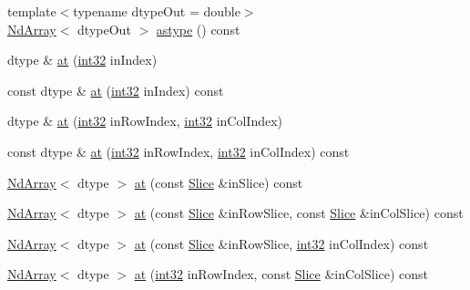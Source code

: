 \begin{DoxyCompactItemize}
\item 
{\footnotesize template$<$typename dtype\+Out  = double$>$ }\\\mbox{\hyperlink{class_num_c_1_1_nd_array}{Nd\+Array}}$<$ dtype\+Out $>$ \mbox{\hyperlink{class_num_c_1_1_nd_array_a03c8719dffd012fa234b4ae2feae2ed2}{astype}} () const
\item 
dtype \& \mbox{\hyperlink{class_num_c_1_1_nd_array_ad50a883233561c1b8345678ae5b1480e}{at}} (\mbox{\hyperlink{namespace_num_c_aa5a7e69266097d55816d4cdb19542b53}{int32}} in\+Index)
\item 
const dtype \& \mbox{\hyperlink{class_num_c_1_1_nd_array_a4d705eda354e6632dd457d3a33456073}{at}} (\mbox{\hyperlink{namespace_num_c_aa5a7e69266097d55816d4cdb19542b53}{int32}} in\+Index) const
\item 
dtype \& \mbox{\hyperlink{class_num_c_1_1_nd_array_a1b7551b29fd04ad88102ae279357057a}{at}} (\mbox{\hyperlink{namespace_num_c_aa5a7e69266097d55816d4cdb19542b53}{int32}} in\+Row\+Index, \mbox{\hyperlink{namespace_num_c_aa5a7e69266097d55816d4cdb19542b53}{int32}} in\+Col\+Index)
\item 
const dtype \& \mbox{\hyperlink{class_num_c_1_1_nd_array_a2a0ece5152ba2a14d4e9ae0566499052}{at}} (\mbox{\hyperlink{namespace_num_c_aa5a7e69266097d55816d4cdb19542b53}{int32}} in\+Row\+Index, \mbox{\hyperlink{namespace_num_c_aa5a7e69266097d55816d4cdb19542b53}{int32}} in\+Col\+Index) const
\item 
\mbox{\hyperlink{class_num_c_1_1_nd_array}{Nd\+Array}}$<$ dtype $>$ \mbox{\hyperlink{class_num_c_1_1_nd_array_a2be747f5c745a8a70fc1e036c912ec4a}{at}} (const \mbox{\hyperlink{class_num_c_1_1_slice}{Slice}} \&in\+Slice) const
\item 
\mbox{\hyperlink{class_num_c_1_1_nd_array}{Nd\+Array}}$<$ dtype $>$ \mbox{\hyperlink{class_num_c_1_1_nd_array_a45b3ca6d928b673c97bd9e2792a71706}{at}} (const \mbox{\hyperlink{class_num_c_1_1_slice}{Slice}} \&in\+Row\+Slice, const \mbox{\hyperlink{class_num_c_1_1_slice}{Slice}} \&in\+Col\+Slice) const
\item 
\mbox{\hyperlink{class_num_c_1_1_nd_array}{Nd\+Array}}$<$ dtype $>$ \mbox{\hyperlink{class_num_c_1_1_nd_array_aa81e931f772bb2a452e77cfa6760f45c}{at}} (const \mbox{\hyperlink{class_num_c_1_1_slice}{Slice}} \&in\+Row\+Slice, \mbox{\hyperlink{namespace_num_c_aa5a7e69266097d55816d4cdb19542b53}{int32}} in\+Col\+Index) const
\item 
\mbox{\hyperlink{class_num_c_1_1_nd_array}{Nd\+Array}}$<$ dtype $>$ \mbox{\hyperlink{class_num_c_1_1_nd_array_ab54ef20be682805145902d979e9a0c44}{at}} (\mbox{\hyperlink{namespace_num_c_aa5a7e69266097d55816d4cdb19542b53}{int32}} in\+Row\+Index, const \mbox{\hyperlink{class_num_c_1_1_slice}{Slice}} \&in\+Col\+Slice) const

\end{DoxyCompactItemize}
